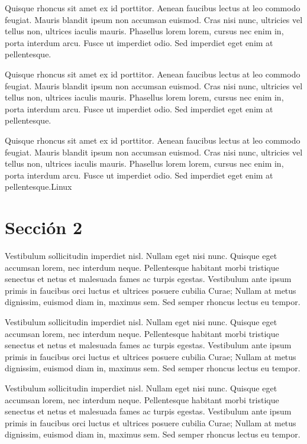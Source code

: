 	Quisque rhoncus sit amet ex id porttitor. Aenean faucibus lectus at leo commodo feugiat. Mauris blandit ipsum non accumsan euismod. Cras nisi nunc, ultricies vel tellus non, ultrices iaculis mauris. Phasellus lorem lorem, cursus nec enim in, porta interdum arcu. Fusce ut imperdiet odio. Sed imperdiet eget enim at pellentesque.
	
	Quisque rhoncus sit amet ex id porttitor. Aenean faucibus lectus at leo commodo feugiat. Mauris blandit ipsum non accumsan euismod. Cras nisi nunc, ultricies vel tellus non, ultrices iaculis mauris. Phasellus lorem lorem, cursus nec enim in, porta interdum arcu. Fusce ut imperdiet odio. Sed imperdiet eget enim at pellentesque.\cite{IEEEreferencias:Ref1} 
	
	Quisque rhoncus sit amet ex id porttitor. Aenean faucibus lectus at leo commodo feugiat. Mauris blandit ipsum non accumsan euismod. Cras nisi nunc, ultricies vel tellus non, ultrices iaculis mauris. Phasellus lorem lorem, cursus nec enim in, porta interdum arcu. Fusce ut imperdiet odio. Sed imperdiet eget enim at pellentesque.\gls{Linux}
	
	
	
	\section{Sección 2}
	
	Vestibulum sollicitudin imperdiet nisl. Nullam eget nisi nunc. Quisque eget accumsan lorem, nec interdum neque. Pellentesque habitant morbi tristique senectus et netus et malesuada fames ac turpis egestas. Vestibulum ante ipsum primis in faucibus orci luctus et ultrices posuere cubilia Curae; Nullam at metus dignissim, euismod diam in, maximus sem. Sed semper rhoncus lectus eu tempor.
	
	Vestibulum sollicitudin imperdiet nisl. Nullam eget nisi nunc. Quisque eget accumsan lorem, nec interdum neque. Pellentesque habitant morbi tristique senectus et netus et malesuada fames ac turpis egestas. Vestibulum ante ipsum primis in faucibus orci luctus et ultrices posuere cubilia Curae; Nullam at metus dignissim, euismod diam in, maximus sem. Sed semper rhoncus lectus eu tempor.
	
	Vestibulum sollicitudin imperdiet nisl. Nullam eget nisi nunc. Quisque eget accumsan lorem, nec interdum neque. Pellentesque habitant morbi tristique senectus et netus et malesuada fames ac turpis egestas. Vestibulum ante ipsum primis in faucibus orci luctus et ultrices posuere cubilia Curae; Nullam at metus dignissim, euismod diam in, maximus sem. Sed semper rhoncus lectus eu tempor.
	
